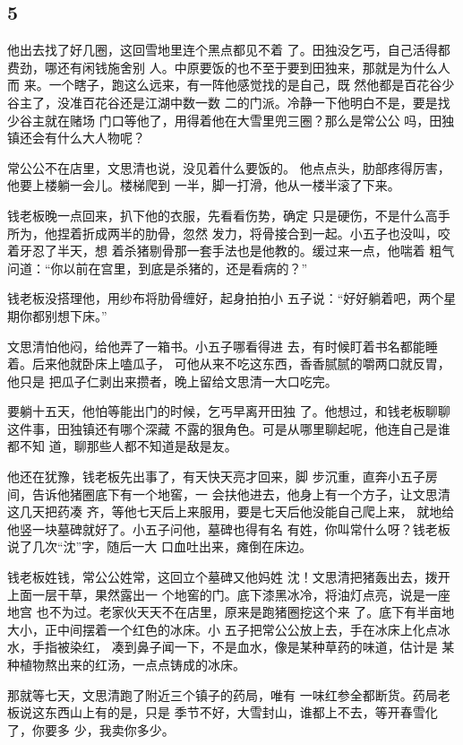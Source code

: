 {\centering\subsection{5}}

他出去找了好几圈，这回雪地里连个黑点都见不着
了。田独没乞丐，自己活得都费劲，哪还有闲钱施舍别
人。中原要饭的也不至于要到田独来，那就是为什么人而
来。一个瞎子，跑这么远来，有一阵他感觉找的是自己，既
然他都是百花谷少谷主了，没准百花谷还是江湖中数一数
二的门派。冷静一下他明白不是，要是找少谷主就在赌场
门口等他了，用得着他在大雪里兜三圈？那么是常公公
吗，田独镇还会有什么大人物呢？

常公公不在店里，文思清也说，没见着什么要饭的。
他点点头，肋部疼得厉害，他要上楼躺一会儿。楼梯爬到
一半，脚一打滑，他从一楼半滚了下来。

钱老板晚一点回来，扒下他的衣服，先看看伤势，确定
只是硬伤，不是什么高手所为，他捏着折成两半的肋骨，忽然
发力，将骨接合到一起。小五子也没叫，咬着牙忍了半天，想
着杀猪剔骨那一套手法也是他教的。缓过来一点，他喘着
粗气问道：“你以前在宫里，到底是杀猪的，还是看病的？”

钱老板没搭理他，用纱布将肋骨缠好，起身拍拍小
五子说：“好好躺着吧，两个星期你都别想下床。”

文思清怕他闷，给他弄了一箱书。小五子哪看得进
去，有时候盯着书名都能睡着。后来他就卧床上嗑瓜子，
可他从来不吃这东西，香香腻腻的嚼两口就反胃，他只是
把瓜子仁剥出来攒者，晚上留给文思清一大口吃完。

要躺十五天，他怕等能出门的时候，乞丐早离开田独
了。他想过，和钱老板聊聊这件事，田独镇还有哪个深藏
不露的狠角色。可是从哪里聊起呢，他连自己是谁都不知
道，聊那些人都不知道是敌是友。

他还在犹豫，钱老板先出事了，有天快天亮才回来，脚
步沉重，直奔小五子房间，告诉他猪圈底下有一个地窖，一
会扶他进去，他身上有一个方子，让文思清这几天把药凑
齐，等他七天后上来服用，要是七天后他没能自己爬上来，
就地给他竖一块墓碑就好了。小五子问他，墓碑也得有名
有姓，你叫常什么呀？钱老板说了几次“沈”字，随后一大
口血吐出来，瘫倒在床边。

钱老板姓钱，常公公姓常，这回立个墓碑又他妈姓
沈！文思清把猪轰出去，拨开上面一层干草，果然露出一
个地窖的门。底下漆黑冰冷，将油灯点亮，说是一座地宫
也不为过。老家伙天天不在店里，原来是跑猪圈挖这个来
了。底下有半亩地大小，正中间摆着一个红色的冰床。小
五子把常公公放上去，手在冰床上化点冰水，手指被染红，
凑到鼻子闻一下，不是血水，像是某种草药的味道，估计是
某种植物熬出来的红汤，一点点铸成的冰床。

那就等七天，文思清跑了附近三个镇子的药局，唯有
一味红参全都断货。药局老板说这东西山上有的是，只是
季节不好，大雪封山，谁都上不去，等开春雪化了，你要多
少，我卖你多少。

